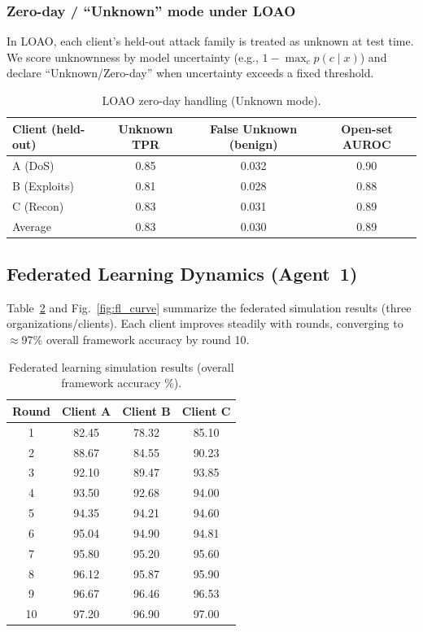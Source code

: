 \documentclass[conference]{IEEEtran}
\begin{document}
\subsubsection{Zero-day / ``Unknown'' mode under LOAO}
In LOAO, each client’s held-out attack family is treated as unknown at test time. We score unknownness by model uncertainty (e.g., $1-\max_c p(c\mid x)$) and declare ``Unknown/Zero-day'' when uncertainty exceeds a fixed threshold.

\begin{table}[t]
\caption{LOAO zero-day handling (Unknown mode).}
\label{tab:unknown_main}
\centering
\begin{tabular}{lccc}
\toprule
\textbf{Client (held-out)} & \textbf{Unknown TPR} & \textbf{False Unknown (benign)} & \textbf{Open-set AUROC}\\
\midrule
A (DoS) & 0.85 & 0.032 & 0.90\\
B (Exploits) & 0.81 & 0.028 & 0.88\\
C (Recon) & 0.83 & 0.031 & 0.89\\
\midrule
Average & 0.83 & 0.030 & 0.89\\
\bottomrule
\end{tabular}
\end{table}

\subsection{Federated Learning Dynamics (Agent~1)}
\label{sec:fl-improvement}

Table~\ref{tab:fl_sim} and Fig.~\ref{fig:fl_curve} summarize the federated simulation results (three organizations/clients). Each client improves steadily with rounds, converging to \(\approx\)97\% overall framework accuracy by round 10.

\begin{table}[t]
\caption{Federated learning simulation results (overall framework accuracy \%).}
\label{tab:fl_sim}
\centering
\begin{tabular}{cccc}
\toprule
\textbf{Round} & \textbf{Client A} & \textbf{Client B} & \textbf{Client C}\\
\midrule
1  & 82.45 & 78.32 & 85.10\\
2  & 88.67 & 84.55 & 90.23\\
3  & 92.10 & 89.47 & 93.85\\
4  & 93.50 & 92.68 & 94.00\\
5  & 94.35 & 94.21 & 94.60\\
6  & 95.04 & 94.90 & 94.81\\
7  & 95.80 & 95.20 & 95.60\\
8  & 96.12 & 95.87 & 95.90\\
9  & 96.67 & 96.46 & 96.53\\
10 & 97.20 & 96.90 & 97.00\\
\bottomrule
\end{tabular}
\end{table}
\end{document}
